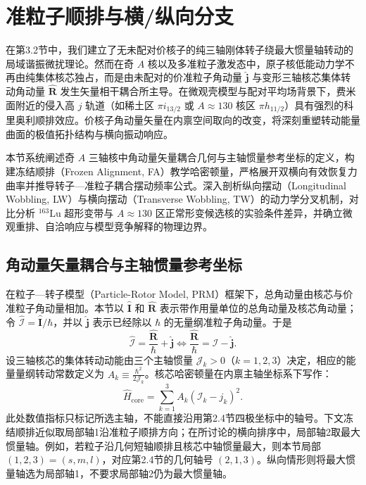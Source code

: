 \section{准粒子顺排与横/纵向分支}\label{sec:3-3}

在第3.2节中，我们建立了无未配对价核子的纯三轴刚体转子绕最大惯量轴转动的局域谐振微扰理论。然而在奇 $A$ 核以及多准粒子激发态中，原子核低能动力学不再由纯集体核芯独占，而是由未配对的价准粒子角动量 $\hat{\mathbf{j}}$ 与变形三轴核芯集体转动角动量 $\hat{\mathbf{R}}$ 发生矢量相干耦合所主导。在微观壳模型与配对平均场背景下，费米面附近的侵入高 $j$ 轨道（如稀土区 $\pi i_{13/2}$ 或 $A \approx 130$ 核区 $\pi h_{11/2}$）具有强烈的科里奥利顺排效应。价核子角动量矢量在内禀空间取向的改变，将深刻重塑转动能量曲面的极值拓扑结构与横向振动响应。

本节系统阐述奇 $A$ 三轴核中角动量矢量耦合几何与主轴惯量参考坐标的定义，构建冻结顺排（Frozen Alignment, FA）教学哈密顿量，严格展开双横向有效恢复力曲率并推导转子—准粒子耦合摆动频率公式。深入剖析纵向摆动（Longitudinal Wobbling, LW）与横向摆动（Transverse Wobbling, TW）的动力学分叉机制，对比分析 $^{163}\mathrm{Lu}$ 超形变带与 $A \approx 130$ 区正常形变候选核的实验条件差异，并确立微观重排、自洽响应与模型竞争解释的物理边界。

\subsection{角动量矢量耦合与主轴惯量参考坐标}\label{sec:3-3-1}

在粒子—转子模型（Particle-Rotor Model, PRM）框架下，总角动量由核芯与价准粒子角动量相加。本节以 $\hat{\mathbf I}$ 和 $\hat{\mathbf R}$ 表示带作用量单位的总角动量及核芯角动量；令 $\hat{\boldsymbol{\mathcal I}}=\hat{\mathbf I}/\hbar$，并以 $\hat{\mathbf j}$ 表示已经除以 $\hbar$ 的无量纲准粒子角动量。于是
\begin{equation}\label{eq:3-3-vector-coupling}
\hat{\boldsymbol{\mathcal{I}}} = \frac{\hat{\mathbf{R}}}{\hbar} + \hat{\mathbf{j}} \iff \frac{\hat{\mathbf{R}}}{\hbar} = \hat{\boldsymbol{\mathcal{I}}} - \hat{\mathbf{j}}.
\end{equation}
设三轴核芯的集体转动动能由三个主轴惯量 $\mathcal{J}_k > 0$（$k = 1, 2, 3$）决定，相应的能量量纲转动常数定义为 $A_k \equiv \frac{\hbar^2}{2\mathcal{J}_k}$。核芯哈密顿量在内禀主轴坐标系下写作：
\begin{equation}\label{eq:3-3-core-H}
\hat{H}_{\text{core}} = \sum_{k=1}^3 A_k \left( \mathcal{I}_k - j_k \right)^2.
\end{equation}
此处数值指标只标记所选主轴，不能直接沿用第2.4节四极坐标中的轴号。下文冻结顺排近似取局部轴1沿准粒子顺排方向；在所讨论的横向排序中，局部轴2取最大惯量轴。例如，若粒子沿几何短轴顺排且核芯中轴惯量最大，则本节局部 $(1,2,3)=(s,m,l)$，对应第2.4节的几何轴号 $(2,1,3)$。纵向情形则将最大惯量轴选为局部轴1，不要求局部轴2仍为最大惯量轴。


